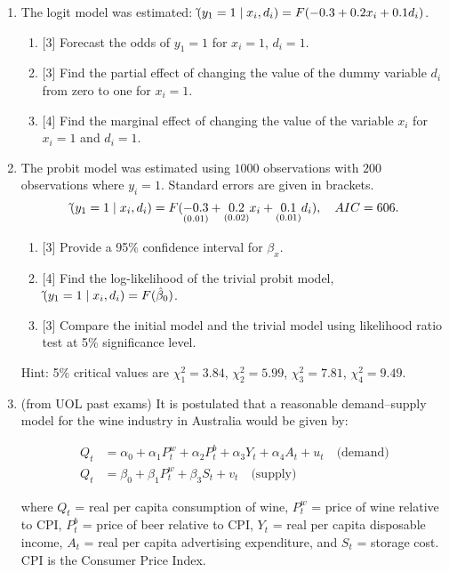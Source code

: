 \documentclass[12pt]{article}
\let\P\relax
\DeclareMathOperator{\P}{\mathbb{P}}
\newcommand{\hb}{\hat\beta}
\begin{document}
\begin{enumerate}
    \newpage
    \item The logit model was estimated:
    $\hat\P(y_1 = 1 \mid x_i, d_i) = F(-0.3 + 0.2 x_i + 0.1 d_i)$.
    \begin{enumerate}
        \item {[3]} Forecast the odds of $y_1 = 1$ for $x_i = 1$, $d_i = 1$.
        \item {[3]} Find the partial effect of changing the value of the dummy variable $d_i$ from zero to one for $x_i = 1$.
        \item {[4]} Find the marginal effect of changing the value of the variable $x_i$ for $x_i = 1$ and $d_i = 1$.
    \end{enumerate}


    \item The probit model was estimated using $1000$ observations with $200$ observations where $y_i = 1$. 
    Standard errors are given in brackets.
    \[
    \hat\P(y_1 = 1 \mid x_i, d_i) = F(\underset{(0.01)}{-0.3} + \underset{(0.02)}{0.2} x_i + \underset{(0.01)}{0.1} d_i), \quad AIC = 606.
    \]
    \begin{enumerate}
        \item {[3]} Provide a 95\% confidence interval for $\beta_x$.
        \item {[4]} Find the log-likelihood of the trivial probit model, $\hat\P(y_1 = 1 \mid x_i, d_i) = F(\hb_0)$.
        \item {[3]} Compare the initial model and the trivial model using likelihood ratio test at 5\% significance level.
    \end{enumerate}

    Hint: 5\% critical values are $\chi^2_1 = 3.84$,  $\chi^2_2 = 5.99$, $\chi^2_3 = 7.81$, $\chi^2_4 = 9.49$.


    \item (from UOL past exams) It is postulated that a reasonable demand–supply model for the wine industry in Australia would be given by:

    \begin{align*}
        Q_t &= \alpha_0 + \alpha_1 P^w_t + \alpha_2 P^b_t + \alpha_3 Y_t + \alpha_4 A_t + u_t \quad \text{(demand)} \\
        Q_t &= \beta_0 + \beta_1 P^w_t + \beta_3 S_t + v_t \quad \text{(supply)}
    \end{align*}
    
    where $Q_t$ = real per capita consumption of wine, $P^w_t$ = price of wine relative to CPI, $P^b_t$ = price of beer relative to CPI, $Y_t$ = real per capita disposable income, $A_t$ = real per capita advertising expenditure, and $S_t$ = storage cost. CPI is the Consumer Price Index.
    

\end{enumerate}
\end{document}
